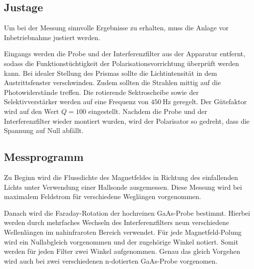\subsection{Justage}
Um bei der Messung sinnvolle Ergebnisse zu erhalten, muss die Anlage vor Inbetriebnahme justiert werden. 

\noindent
Eingangs werden die Probe und der Interferenzfilter aus der Apparatur entfernt, sodass die Funktionstüchtigkeit der
Polarisationsvorrichtung überprüft werden kann. Bei idealer Stellung des Prismas sollte die Lichtintensität in dem 
Austrittsfenster verschwinden. Zudem sollten die Strahlen mittig auf die Photowiderstände treffen. 
Die rotierende Sektroscheibe sowie der Selektivverstärker werden auf eine Frequenz von $\SI{450}{\hertz}$ geregelt. 
Der Gütefaktor wird auf den Wert $Q=\num{100}$ eingestellt. 
Nachdem die Probe und der Interferenzfilter wieder montiert wurden, wird der Polarisator so gedreht, dass die Spannung auf Null
abfällt. 

\subsection{Messprogramm}
Zu Beginn wird die Flussdichte des Magnetfeldes in Richtung des einfallenden Lichts unter Verwendung einer Hallsonde ausgemessen.
Diese Messung wird bei maximalem Feldstrom für verschiedene Weglängen vorgenommen.

\noindent
Danach wird die Faraday-Rotation der hochreinen GaAs-Probe bestimmt. Hierbei werden durch mehrfaches Wechseln des Interferenzfilters 
neun verschiedene Wellenlängen im nahinfraroten Bereich verwendet. Für jede Magnetfeld-Polung wird ein Nullabgleich vorgenommen 
und der zugehörige Winkel notiert. Somit werden für jeden Filter zwei Winkel aufgenommen. Genau das gleich Vorgehen wird auch bei 
zwei verschiedenen n-dotierten GaAs-Probe vorgenomen. 